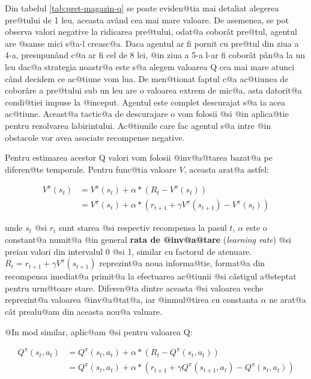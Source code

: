 Din tabelul \ref{tab:pret-magazin-q} se poate eviden@tia mai detaliat alegerea pre@tului de 1 leu, aceasta av\^and cea mai mare valoare. De asemenea, se pot observa valori negative la ridicarea pre@tului, odat@a cobor\^ at pre@tul, agentul are @sanse mici s@a-l creasc@a. Daca agentul ar fi pornit cu pre@tul din ziua a 4-a, presupun\^ and c@a ar fi cel de 8 lei, @in ziua a 5-a l-ar fi cobor\^ at p\^ an@a la un leu dac@a strategia noastr@a este s@a alegem valoarea Q cea mai mare atunci c\^and decidem ce ac@tiune vom lua. De men@tionat faptul c@a ac@tiunea de cobor\^ are a pre@tului sub un leu are o valoarea extrem de mic@a, asta datorit@a condi@tiei impuse la @inceput. Agentul este complet descurajat s@a ia acea ac@tiune. Aceast@a tactic@a de descurajare o vom folosii @si @in aplica@tie pentru rezolvarea labirintului. Ac@tiunile care fac agentul s@a intre @in obstacole vor avea asociate recompense negative.

Pentru estimarea acestor Q valori vom folosii @inv@a@tarea bazat@a pe diferen@te temporale. Pentru func@tia valoare $V$, aceasta arat@a astfel:



\begin{align}
	V^{\pi}(s_t) & =  V^{\pi}(s_t) + \alpha * \left( R_t - V^{\pi}(s_t) \right) \\
	 & =  V^{\pi}(s_t) + \alpha * \left( r_{t+1} + \gamma V^{\pi}(s_{t+1})  - V^{\pi}(s_t) \right)
\end{align}

\noindent unde $s_t$ @si $r_t$ sunt starea @si respectiv recompensa la pasul $t$, $\alpha$ este o constant@a numit@a @in general \textbf{rata de @inv@a@tare} (\textsl{learning rate}) @si preiau valori din intervalul 0 @si 1, similar cu factorul de atenuare. $R_t = r_{t+1} + \gamma V^{\pi}(s_{t+1}) $ reprezint@a noua informa@tie, format@a din recompensa imediat@a primit@a la efectuarea ac@tiunii @si c\^ astigul a@steptat pentru urm@toare stare. Diferen@ta dintre aceasta @si valoarea veche reprezint@a valoarea @inv@a@tat@a, iar @inmul@tirea cu constanta $\alpha$ ne arat@a c\^ at prealu@am din aceasta nou@a valuare.

@In mod similar, aplic@am @si pentru valoarea Q:

\begin{align}
	Q^{\pi}(s_t, a_t) & =  Q^{\pi}(s_t, a_t) + \alpha * \left( R_t - Q^{\pi}(s_t, a_t) \right) \\
	 & =  Q^{\pi}(s_t, a_t) + \alpha * \left( r_{t+1} + \gamma Q^{\pi}(s_{t+1}, a_t)  - Q^{\pi}(s_t, a_t) \right)
\end{align}

